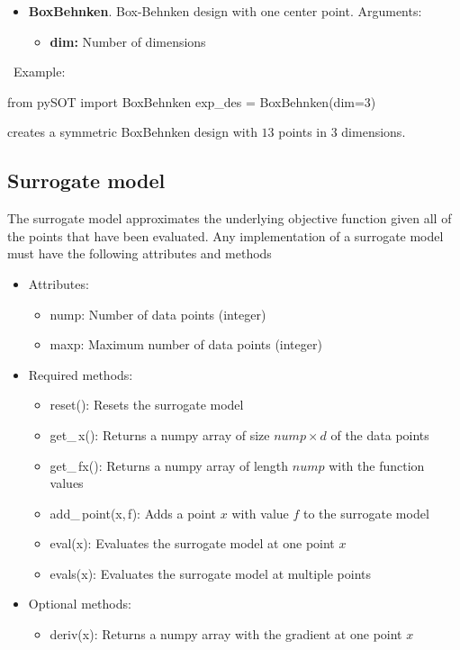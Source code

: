 \documentclass[]{article}
\begin{document}
\begin{itemize}
\item \textbf{BoxBehnken}. Box-Behnken design with one center point. Arguments:
\begin{itemize}
\item \textbf{dim:} Number of dimensions
\end{itemize} 
\end{itemize}
\ \newline Example: 
\begin{python}
from pySOT import BoxBehnken
exp_des = BoxBehnken(dim=3)
\end{python}
creates a symmetric BoxBehnken design with $13$ points in 3 dimensions.

\subsection{Surrogate model} 
\label{surrogate}
The surrogate model approximates the underlying objective function given all of the points that have been evaluated. Any implementation of
a surrogate model must have the following attributes and methods
\begin{itemize}
\item[] {Attributes}: 
\begin{itemize}
\item nump: Number of data points (integer)
\item maxp: Maximum number of data points (integer)
\end{itemize}
\item[] {Required methods}:
\begin{itemize}
\item reset(): Resets the surrogate model
\item get\_\,x(): Returns a numpy array of size $nump \times d$ of the data points
\item get\_\,fx(): Returns a numpy array of length $nump$ with the function values
\item add\_\,point(x,\,f): Adds a point $x$ with value $f$ to the surrogate model
\item eval(x): Evaluates the surrogate model at one point $x$
\item evals(x): Evaluates the surrogate model at multiple points
\end{itemize}
\item[] {Optional methods}:
\begin{itemize}
\item deriv(x): Returns a numpy array with the gradient at one point $x$
\end{itemize}
\end{itemize}
\end{document}
